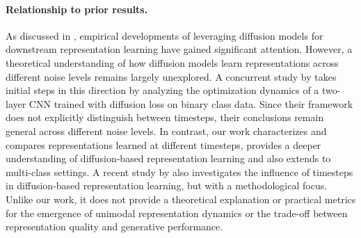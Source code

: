 \begin{itemize}[leftmargin=*]
\end{itemize}


\paragraph{Relationship to prior results.}As discussed in ,
empirical developments of leveraging diffusion models for downstream representation learning have gained significant attention. However, a theoretical understanding of how diffusion models learn representations across different noise levels remains largely unexplored. A concurrent study by \citep{han2024feature} takes initial steps in this direction by analyzing the optimization dynamics of a two-layer CNN trained with diffusion loss on binary class data. Since their framework does not explicitly distinguish between timesteps, their conclusions remain general across different noise levels. In contrast, our work characterizes and compares representations learned at different timesteps, provides a deeper understanding of diffusion-based representation learning and also extends to multi-class settings. A recent study by \citep{yue2024exploring} also investigates the influence of timesteps in diffusion-based representation learning, but with a methodological focus. Unlike our work, it does not provide a theoretical explanation or practical metrics for the emergence of unimodal representation dynamics or the trade-off between representation quality and generative performance.


